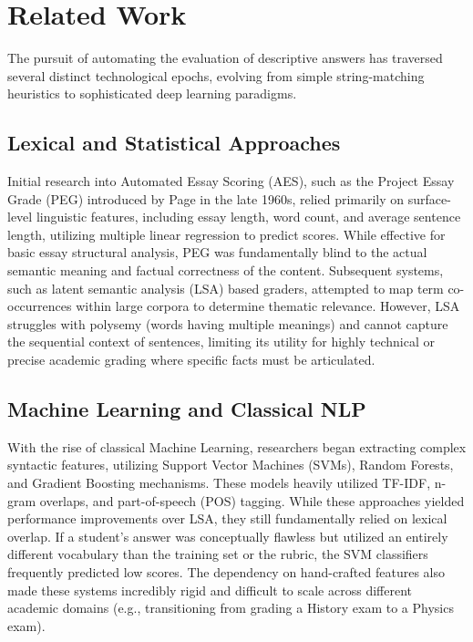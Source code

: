 \documentclass[conference]{IEEEtran}
\begin{document}
\section{Related Work}
The pursuit of automating the evaluation of descriptive answers has traversed several distinct technological epochs, evolving from simple string-matching heuristics to sophisticated deep learning paradigms.

\subsection{Lexical and Statistical Approaches}
Initial research into Automated Essay Scoring (AES), such as the Project Essay Grade (PEG) introduced by Page in the late 1960s, relied primarily on surface-level linguistic features, including essay length, word count, and average sentence length, utilizing multiple linear regression to predict scores. While effective for basic essay structural analysis, PEG was fundamentally blind to the actual semantic meaning and factual correctness of the content. Subsequent systems, such as latent semantic analysis (LSA) based graders, attempted to map term co-occurrences within large corpora to determine thematic relevance. However, LSA struggles with polysemy (words having multiple meanings) and cannot capture the sequential context of sentences, limiting its utility for highly technical or precise academic grading where specific facts must be articulated.

\subsection{Machine Learning and Classical NLP}
With the rise of classical Machine Learning, researchers began extracting complex syntactic features, utilizing Support Vector Machines (SVMs), Random Forests, and Gradient Boosting mechanisms. These models heavily utilized TF-IDF, n-gram overlaps, and part-of-speech (POS) tagging. While these approaches yielded performance improvements over LSA, they still fundamentally relied on lexical overlap. If a student's answer was conceptually flawless but utilized an entirely different vocabulary than the training set or the rubric, the SVM classifiers frequently predicted low scores. The dependency on hand-crafted features also made these systems incredibly rigid and difficult to scale across different academic domains (e.g., transitioning from grading a History exam to a Physics exam).
\end{document}
